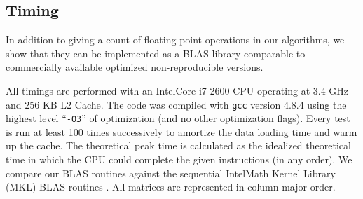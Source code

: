 \subsection{Timing}
  In addition to giving a count of floating point operations in our algorithms, we show that they can be implemented as a BLAS library comparable to commercially available optimized non-reproducible versions.

  All timings are performed with an Intel\textregistered Core i7-2600 CPU operating at 3.4 GHz and 256 KB L2 Cache. The code was compiled with \texttt{gcc} version 4.8.4 using the highest level ``\texttt{-O3}'' of optimization (and no other optimization flags). Every test is run at least 100 times successively to amortize the data loading time and warm up the cache. The theoretical peak time is calculated as the idealized theoretical time in which the CPU could complete the given instructions (in any order). We compare our BLAS routines against the sequential Intel\textregistered Math Kernel Library (MKL) BLAS routines \cite{MKL}. All matrices are represented in column-major order.

